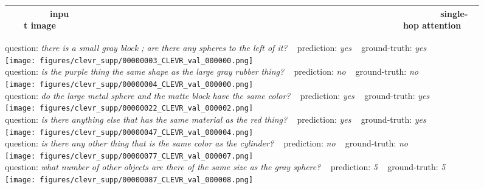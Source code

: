 \documentclass[10pt,twocolumn,letterpaper]{article}
\begin{document}
\begin{figure*}[t]
\centering
\small
\begin{tabularx}{\linewidth}{*{6}{c}}
~~~~~~~~input image & ~~~~~~~~~~~~~~~~~ & ~~~~~~~~~~~~~~~~~~~~~~~ & ~~~~~~~~~~~~~~~~~~~~~~ & ~~~~~~~~~~~~~~~~~~~~~~~ & ~~~~~~~~~single-hop attention  \\
\hline
\end{tabularx}

\vspace{1mm}

question: \textit{there is a small gray block ; are there any spheres to the left of it?} ~ prediction: \textit{yes} ~ ground-truth: \textit{yes} \\
\texttt{[image: figures/clevr\_supp/00000003\_CLEVR\_val\_000000.png]} \\

question: \textit{is the purple thing the same shape as the large gray rubber thing?} ~ prediction: \textit{no} ~ ground-truth: \textit{no} \\
\texttt{[image: figures/clevr\_supp/00000004\_CLEVR\_val\_000000.png]} \\

question: \textit{do the large metal sphere and the matte block have the same color?} ~ prediction: \textit{yes} ~ ground-truth: \textit{yes} \\
\texttt{[image: figures/clevr\_supp/00000022\_CLEVR\_val\_000002.png]} \\

question: \textit{is there anything else that has the same material as the red thing?} ~ prediction: \textit{yes} ~ ground-truth: \textit{yes} \\
\texttt{[image: figures/clevr\_supp/00000047\_CLEVR\_val\_000004.png]} \\

question: \textit{is there any other thing that is the same color as the cylinder?} ~ prediction: \textit{no} ~ ground-truth: \textit{no} \\
\texttt{[image: figures/clevr\_supp/00000077\_CLEVR\_val\_000007.png]} \\

question: \textit{what number of other objects are there of the same size as the gray sphere?} ~ prediction: \textit{5} ~ ground-truth: \textit{5} \\
\texttt{[image: figures/clevr\_supp/00000087\_CLEVR\_val\_000008.png]} \\


\end{figure*}
\end{document}
